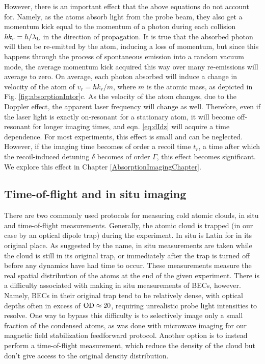 However, there is an important effect that the above equations do not account for. Namely, as the atoms absorb light from the probe beam, they also get a momentum kick equal to the momentum of a photon during each collision $\hbar k_r=h/\lambda_{\rm L}$ in the direction of propagation. It is true that the absorbed photon will then be re-emitted by the atom, inducing a loss of momentum, but since this happens through the process of spontaneous emission into a random vacuum mode, the average momentum kick acquired this way over many re-emissions will average to zero. On average, each photon absorbed will induce a change in velocity of the atom of $v_r=\hbar k_r/m$, where $m$ is the atomic mass, as depicted in Fig. \ref{fig:absorptionIntor}c. As the velocity of the atom changes, due to the Doppler effect, the apparent laser frequency will change as well. Therefore, even if the laser light is exactly on-resonant for a stationary atom, it will become off-resonant for longer imaging times, and eqn. \ref{eq:dIdz} will acquire a time dependence. For most experiments, this effect is small and can be neglected. However, if the imaging time becomes of order a recoil time $t_r$, a time after which the recoil-induced detuning $\delta$ becomes of order $\Gamma$, this effect becomes significant. We explore this effect in Chapter \ref{AbsorptionImagingChapter}.  

\subsection{Time-of-flight and in situ imaging}\label{sec:timeOfFlight}
There are two commonly used protocols for measuring cold atomic clouds, in situ and time-of-flight measurements. Generally, the atomic cloud is trapped (in our case by an optical dipole trap) during the experiment. In situ is Latin for in its original place. As suggested by the name, in situ measurements are taken while the cloud is still in its original trap, or immediately after the trap is turned off before any dynamics have had time to occur. These measurements measure the real spatial distribution of the atoms at the end of the given experiment. There is a difficulty associated with making in situ measurements of BECs, however. Namely, BECs in their original trap tend to be relatively dense, with optical depths often in excess of ${\rm OD}\approx20$, requiring unrealistic probe light intensities to resolve. One way to bypass this difficulty is to selectively image only a small fraction of the condensed atoms, as was done with microwave imaging for our magnetic field stabilization feedforward protocol. Another option is to instead perform a time-of-flight measurement, which reduce the density of the cloud but don't give access to the original density distribution.

